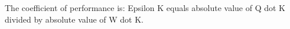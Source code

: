 The coefficient of performance is:  
Epsilon K equals absolute value of Q dot K divided by absolute value of W dot K.
